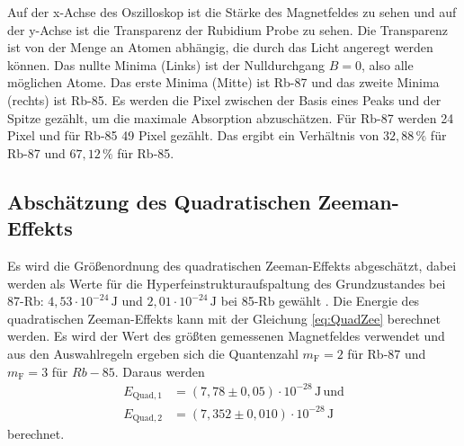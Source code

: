 Auf der x-Achse des Oszilloskop ist die Stärke des Magnetfeldes zu sehen und auf der y-Achse ist die Transparenz der Rubidium Probe zu sehen.
Die Transparenz ist von der Menge an Atomen abhängig, die durch das Licht angeregt werden können.
Das nullte Minima (Links) ist der Nulldurchgang $B = 0$, also alle möglichen Atome.
Das erste Minima (Mitte) ist Rb-87 und das zweite Minima (rechts) ist Rb-85.
Es werden die Pixel zwischen der Basis eines Peaks und der Spitze gezählt, um die maximale Absorption abzuschätzen.
Für Rb-87 werden 24 Pixel und für Rb-85 49 Pixel gezählt.
Das ergibt ein Verhältnis von $32,88\, \%$ für Rb-87 und $67,12 \, \% $ für Rb-85.

\subsection{Abschätzung des Quadratischen Zeeman-Effekts}

Es wird die Größenordnung des quadratischen Zeeman-Effekts abgeschätzt, 
dabei werden als Werte für die Hyperfeinstrukturaufspaltung des Grundzustandes bei 87-Rb: $4,53 \cdot 10^{-24} \, \unit{\joule} $ und $2,01 \cdot 10^{-24} \, \unit{\joule}$ bei  85-Rb  gewählt \cite{v21}.
Die Energie des quadratischen Zeeman-Effekts kann mit der Gleichung \eqref{eq:QuadZee} berechnet werden.
Es wird der Wert des größten gemessenen Magnetfeldes verwendet und aus den Auswahlregeln ergeben sich die Quantenzahl $m_\text{F} = 2$ für Rb-87 und $m_\text{F} = 3$ für $Rb-85$.
Daraus werden 
\begin{align*}
    E_{\text{Quad},1} &= \left(7,78  \pm 0,05 \right)   \cdot 10^{-28} \, \unit{\joule} \, \text{und} \\
    E_{\text{Quad},2} &= \left(7,352 \pm 0,010 \right) \cdot 10^{-28} \, \unit{\joule}
\end{align*}
berechnet.